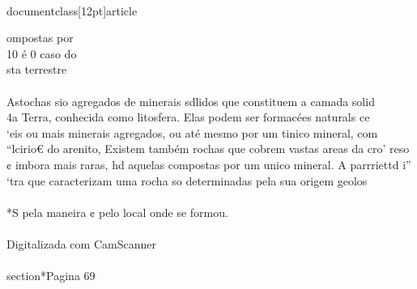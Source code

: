 \\documentclass[12pt]{article}
\begin{document}
ompostas por\\
10 é 0 caso do\\
sta terrestre\\
\\
Astochas sio agregados de minerais sdlidos que constituem a camada solid\\
4a Terra, conhecida como litosfera. Elas podem ser formacées naturals ce\\
‘eis ou mais minerais agregados, ou até mesmo por um tinico mineral, com\\
“lcirio€ do arenito, Existem também rochas que cobrem vastas areas da cro’ reso\\
¢ imbora mais raras, hd aquelas compostas por um unico mineral. A parrriettd i”\\
‘tra que caracterizam uma rocha so determinadas pela sua origem geolos\\
\\
*S pela maneira ¢ pelo local onde se formou.\\
\\
Digitalizada com CamScanner\\

\\section*{Pagina 69}
\end{document}
